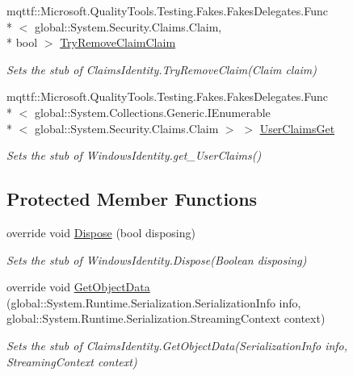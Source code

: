 \begin{DoxyCompactItemize}
mqttf\-::\-Microsoft.\-Quality\-Tools.\-Testing.\-Fakes.\-Fakes\-Delegates.\-Func\\*
$<$ global\-::\-System.\-Security.\-Claims.\-Claim, \\*
bool $>$ \hyperlink{class_system_1_1_security_1_1_principal_1_1_fakes_1_1_stub_windows_identity_a5b7f01699468920752d42fa97cad223b}{Try\-Remove\-Claim\-Claim}
\begin{DoxyCompactList}\small\item\em Sets the stub of Claims\-Identity.\-Try\-Remove\-Claim(\-Claim claim)\end{DoxyCompactList}\item 
mqttf\-::\-Microsoft.\-Quality\-Tools.\-Testing.\-Fakes.\-Fakes\-Delegates.\-Func\\*
$<$ global\-::\-System.\-Collections.\-Generic.\-I\-Enumerable\\*
$<$ global\-::\-System.\-Security.\-Claims.\-Claim $>$ $>$ \hyperlink{class_system_1_1_security_1_1_principal_1_1_fakes_1_1_stub_windows_identity_aad649b991830c6363213b11d73c23d8a}{User\-Claims\-Get}
\begin{DoxyCompactList}\small\item\em Sets the stub of Windows\-Identity.\-get\-\_\-\-User\-Claims()\end{DoxyCompactList}\end{DoxyCompactItemize}
\subsection*{Protected Member Functions}
\begin{DoxyCompactItemize}
\item 
override void \hyperlink{class_system_1_1_security_1_1_principal_1_1_fakes_1_1_stub_windows_identity_a3a5fd5917a6bccb3faf17f2f7ac98ca6}{Dispose} (bool disposing)
\begin{DoxyCompactList}\small\item\em Sets the stub of Windows\-Identity.\-Dispose(\-Boolean disposing)\end{DoxyCompactList}\item 
override void \hyperlink{class_system_1_1_security_1_1_principal_1_1_fakes_1_1_stub_windows_identity_acf056c1e03f9a6a3f304843b314363c4}{Get\-Object\-Data} (global\-::\-System.\-Runtime.\-Serialization.\-Serialization\-Info info, global\-::\-System.\-Runtime.\-Serialization.\-Streaming\-Context context)
\begin{DoxyCompactList}\small\item\em Sets the stub of Claims\-Identity.\-Get\-Object\-Data(\-Serialization\-Info info, Streaming\-Context context)\end{DoxyCompactList}\end{DoxyCompactItemize}
